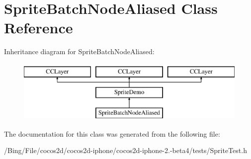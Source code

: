 \hypertarget{interface_sprite_batch_node_aliased}{\section{Sprite\-Batch\-Node\-Aliased Class Reference}
\label{interface_sprite_batch_node_aliased}
}
Inheritance diagram for Sprite\-Batch\-Node\-Aliased\-:\begin{figure}[H]
\begin{center}
\leavevmode
\includegraphics[height=3.000000cm]{interface_sprite_batch_node_aliased}
\end{center}
\end{figure}


The documentation for this class was generated from the following file\-:\begin{DoxyCompactItemize}
\item 
/\-Bing/\-File/cocos2d/cocos2d-\/iphone/cocos2d-\/iphone-\/2.-\/beta4/tests/Sprite\-Test.\-h\end{DoxyCompactItemize}
